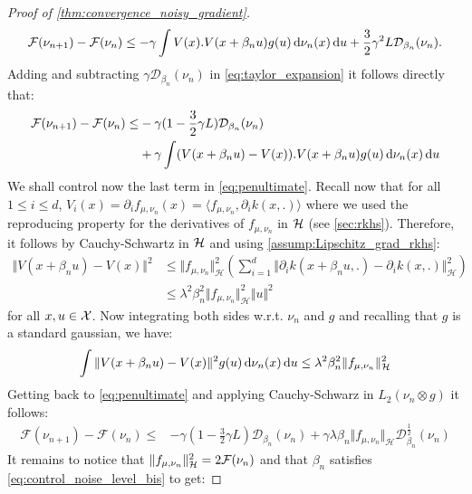 \begin{proof}[Proof of \cref{thm:convergence_noisy_gradient}]
	\begin{align}\label{eq:taylor_expansion}
	\mathcal{F}(\nu_{n+1})-\mathcal{F}(\nu_{n})
	\leq -\gamma \int V(x).V(x+\beta_n u) g(u)\mathop{}\!\mathrm{d}\nu_n(x)\mathop{}\!\mathrm{d} u + \frac{3}{2}\gamma^2L \mathcal{D}_{\beta_n}(\nu_n).
	\end{align} 
Adding and subtracting  $\gamma \mathcal{D}_{\beta_n}(\nu_n)$ in \cref{eq:taylor_expansion} it follows directly that:
\begin{align}\label{eq:penultimate}
\begin{split}
			\mathcal{F}(\nu_{n+1})-\mathcal{F}(\nu_{n} )\leq &   -\gamma (1-\frac{3}{2}\gamma L )\mathcal{D}_{\beta_n}(\nu_n)
 \\
 &+ \gamma\int  (V(x+\beta_n u) -V(x)).V(x+\beta_n u) g(u)\mathop{}\!\mathrm{d}\nu_n(x)\mathop{}\!\mathrm{d} u	
\end{split}
\end{align}
We shall control now the last term in \cref{eq:penultimate}. Recall now that for all $1\le i\le d$, $ V_i(x) = \partial_i f_{\mu,\nu_n}(x) = \langle f_{\mu,\nu_n} , \partial_i k(x,.)\rangle $ where we used the reproducing property for the derivatives of $f_{\mu,\nu_n}$ in ${{\mathcal H}}$ (see \cref{sec:rkhs}). Therefore, it follows by Cauchy-Schwartz in ${{\mathcal H}}$ and using \cref{assump:Lipschitz_grad_rkhs}:
\begin{align*}
\Vert V(x+\beta_n u) -V(x)\Vert^2
&\leq 
\Vert f_{\mu,\nu_n} \Vert_{\mathcal{H}}^2  \left( \sum_{i=1}^{d}\Vert \partial_i k(x+\beta_n u,.) -\partial_i k(x,.)\Vert^2_{\mathcal{H}}\right)\\
&\leq \lambda^2\beta_n^2
\Vert   f_{\mu,\nu_n}\Vert_{\mathcal{H}}^2\Vert u \Vert^2 
\end{align*}
for all $ x,u \in {{\mathcal X}}$. Now integrating both sides w.r.t. $\nu_n$ and $g$ and recalling that $g$ is a standard gaussian, we have:
\begin{align}
	 \int  \Vert V(x+\beta_n u) -V(x)\Vert^2 g(u)\mathop{}\!\mathrm{d}\nu_n(x)\mathop{}\!\mathrm{d} u
\leq 
	\lambda^2\beta^2_n\Vert f_{\mu,\nu_n} \Vert_{\mathcal{H}}^2
\end{align}
Getting back to \cref{eq:penultimate} and applying Cauchy-Schwarz in $L_2(\nu_n\otimes g)$ it follows:
\begin{align}
	\mathcal{F}(\nu_{n+1})-\mathcal{F}(\nu_{n} )\leq &   -\gamma (1-\frac{3}{2}\gamma L )\mathcal{D}_{\beta_n}(\nu_n) +\gamma \lambda\beta_n\Vert f_{\mu,\nu_n} \Vert_{\mathcal{H}}\mathcal{D}^{\frac{1}{2}}_{\beta_n}(\nu_n)
\end{align}
It remains to notice that $\Vert f_{\mu,\nu_n} \Vert_{\mathcal{H}}^2 = 2{{\mathcal F}}(\nu_n)$ and that $\beta_n$ satisfies \cref{eq:control_noise_level_bis} to get:

\end{proof}
